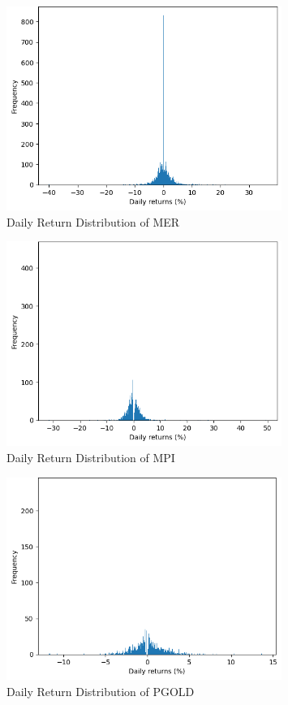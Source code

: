 \begin{figure}[ht]
    \centering
    \includegraphics[width=0.80\textwidth]{./assets/Appendices/B/Distribution_DailyReturns/MER.png}
    \caption{Daily Return Distribution of MER}
    \label{fig:returndist_MER}
\end{figure}
\FloatBarrier

\begin{figure}[ht]
    \centering
    \includegraphics[width=0.80\textwidth]{./assets/Appendices/B/Distribution_DailyReturns/MPI.png}
    \caption{Daily Return Distribution of MPI}
    \label{fig:returndist_MPI}
\end{figure}
\FloatBarrier

\begin{figure}[ht]
    \centering
    \includegraphics[width=0.80\textwidth]{./assets/Appendices/B/Distribution_DailyReturns/PGOLD.png}
    \caption{Daily Return Distribution of PGOLD}
    \label{fig:returndist_PGOLD}
\end{figure}
\FloatBarrier

